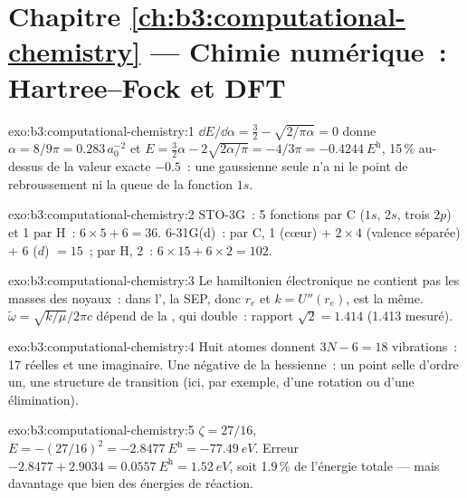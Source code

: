 \section*{Chapitre \ref{ch:b3:computational-chemistry} --- Chimie numérique~: Hartree--Fock et DFT}

\begin{solution}{exo:b3:computational-chemistry:1}
$\dd E/\dd\alpha = \frac32 - \sqrt{2/\pi\alpha} = 0$ donne $\alpha = 8/9\pi = 0.283\,
a_0^{-2}$ et $E = \frac32\alpha - 2\sqrt{2\alpha/\pi} = -4/3\pi = \qty{-0.4244}{\hartree}$,
15\,\% au-dessus de la valeur exacte $-0.5$~: une gaussienne seule n'a ni
le point de rebroussement ni la queue de la fonction $1s$.
\end{solution}

\begin{solution}{exo:b3:computational-chemistry:2}
STO-3G~: 5 fonctions par C ($1s$, $2s$, trois $2p$) et 1 par H~: $6 \times 5 + 6 =
36$. 6-31G(d)~: par C, 1 (cœur) + $2 \times 4$ (valence séparée) + 6
($d$) $= 15$~;
par H, 2~: $6 \times 15 + 6 \times 2 = 102$.
\end{solution}

\begin{solution}{exo:b3:computational-chemistry:3}
Le hamiltonien électronique ne contient pas les masses des noyaux~: dans
l', la SEP, donc $r_e$ et
$k = U''(r_e)$, est la
même. $\tilde\omega = \sqrt{k/\mu}/2\pi c$ dépend de la , qui
double~: rapport $\sqrt2 = 1.414$ (1.413 mesuré).
\end{solution}

\begin{solution}{exo:b3:computational-chemistry:4}
Huit atomes donnent $3N - 6 = 18$ vibrations~: 17 réelles et une
imaginaire. Une  négative de la hessienne~: un point selle
d'ordre un, une structure de transition (ici, par exemple, d'une rotation
ou d'une élimination).
\end{solution}

\begin{solution}{exo:b3:computational-chemistry:5}
$\zeta = 27/16$, $E = -(27/16)^2 = \qty{-2.8477}{\hartree} = \qty{-77.49}{eV}$.
Erreur $-2.8477 + 2.9034 = \qty{0.0557}{\hartree} = \qty{1.52}{eV}$, soit
1.9\,\% de l'énergie totale --- mais davantage que bien des énergies de
réaction.
\end{solution}

